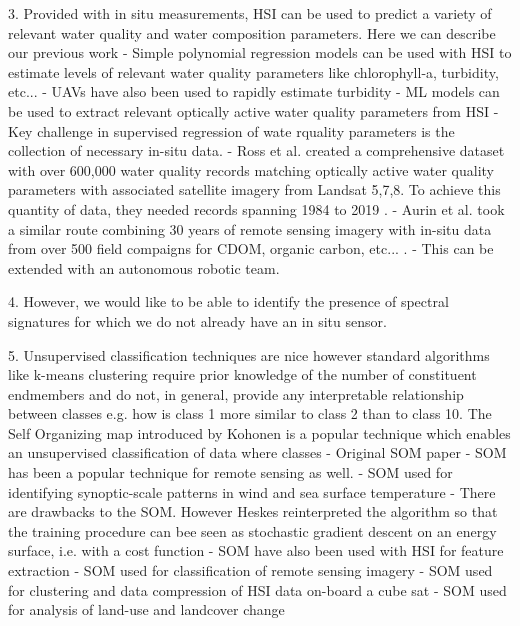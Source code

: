 \documentclass[remotesensing,article,submit,pdftex,moreauthors]{Definitions/mdpi}
\begin{document}
3. Provided with in situ measurements, HSI can be used to predict a variety of relevant water quality and water composition parameters. Here we can describe our previous work
    - Simple polynomial regression models can be used with HSI to estimate levels of relevant water quality parameters like chlorophyll-a, turbidity, etc... \cite{zhang2022selection}
    - UAVs have also been used to rapidly estimate turbidity \cite{vogt2016near}
    - ML models can be used to extract relevant optically active water quality parameters from HSI \cite{lu2021retrieval}
    - Key challenge in supervised regression of wate rquality parameters is the collection of necessary in-situ data.
    - Ross et al. created a comprehensive dataset with over 600,000 water quality records matching optically active water quality parameters with associated satellite imagery from Landsat 5,7,8. To achieve this quantity of data, they needed records spanning 1984 to 2019 \cite{ross2019aquasat}.
    - Aurin et al. took a similar route combining 30 years of remote sensing imagery with in-situ data from over 500 field compaigns for CDOM, organic carbon, etc... \cite{aurin2018remote}.
    - This can be extended with an autonomous robotic team. \cite{robot-team-2}

4. However, we would like to be able to identify the presence of spectral signatures for which we do not already have an in situ sensor. 

5. Unsupervised classification techniques are nice however standard algorithms like k-means clustering require prior knowledge of the number of constituent endmembers and do not, in general, provide any interpretable relationship between classes e.g. how is class 1 more similar to class 2 than to class 10. The Self Organizing map introduced by Kohonen is a popular technique which enables an unsupervised classification of data where classes 
    - Original SOM paper \cite{kohonen-som-1}
    - SOM has been a popular technique for remote sensing as well. 
    - SOM used for identifying synoptic-scale patterns in wind and sea surface temperature \cite{som-satellite}
    - There are drawbacks to the SOM. However Heskes reinterpreted the algorithm so that the training procedure can bee seen as stochastic gradient descent on an energy surface, i.e. with a cost function \cite{som-cost-function}
    - SOM have also been used with HSI for feature extraction \cite{som-hsi}
    - SOM used for classification of remote sensing imagery \cite{msom-remote-sensing}
    - SOM used for clustering and data compression of HSI data on-board a cube sat \cite{danielsen2021self}
    - SOM used for analysis of land-use and landcover change \cite{penfound2021analysis}
    
\end{document}
